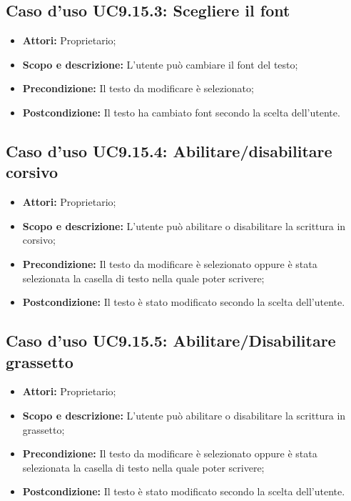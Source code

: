 \subsection{Caso d'uso UC9.15.3: Scegliere il \gls{font}}
\begin{itemize}
	\item \textbf{Attori:} Proprietario;
	\item \textbf{Scopo e descrizione:} L'utente può cambiare il \gls{font} del testo;
	\item \textbf{Precondizione:} Il testo da modificare è selezionato;
	\item \textbf{Postcondizione:} Il testo ha cambiato \gls{font} secondo la scelta dell'utente.
\end{itemize}

\subsection{Caso d'uso UC9.15.4: Abilitare/disabilitare corsivo}
\begin{itemize}
	\item \textbf{Attori:} Proprietario;
	\item \textbf{Scopo e descrizione:} L'utente può abilitare o disabilitare la scrittura in corsivo;
	\item \textbf{Precondizione:} Il testo da modificare è selezionato oppure è stata selezionata la casella di testo nella quale poter scrivere;
	\item \textbf{Postcondizione:} Il testo è stato modificato secondo la scelta dell'utente.
\end{itemize}

\subsection{Caso d'uso UC9.15.5: Abilitare/Disabilitare grassetto}
\begin{itemize}
	\item \textbf{Attori:} Proprietario;
	\item \textbf{Scopo e descrizione:} L'utente può abilitare o disabilitare la scrittura in grassetto;
	\item \textbf{Precondizione:} Il testo da modificare è selezionato oppure è stata selezionata la casella di testo nella quale poter scrivere;
	\item \textbf{Postcondizione:} Il testo è stato modificato secondo la scelta dell'utente.
\end{itemize}

